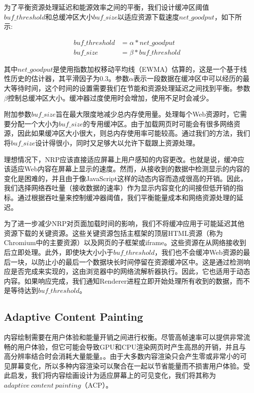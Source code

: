 \documentclass{sig-alternate-05-2015}
\begin{document}
为了平衡资源处理延迟和能源效率之间的平衡，我们设计缓冲区阈值$buf\_threshold$和总缓冲区大小$buf\_size$以适应资源下载速度$net\_goodput$，如下所示:

\begin{align*}
buf\_threshold &= \alpha * net\_goodput \\
buf\_size &= \beta * buf\_threshold
\end{align*}

其中$net\_goodput$是使用指数加权移动平均线（EWMA）估算的，这是一个基于线性历史的估计器，其平滑因子为$0.3$。\cite{9}\cite{10}参数$\alpha$表示一段数据在缓冲区中可以经历的最大等待时间，这个时间的设置需要我们在节能和资源处理延迟之间找到平衡。参数$\beta$控制总缓冲区大小。缓冲器过度使用时会增加，使用不足时会减少。

附加参数$buf\_size$旨在最大限度地减少总内存使用量。处理每个Web资源时，它需要分配一个大小为$buf\_size$的专用缓冲区。由于加载网页时可能会有很多网络资源，因此如果缓冲区大小很大，则总内存使用率可能较高。通过我们的方法，我们将$buf\_size$设计得很小，同时又足够大以允许下载跟上资源处理。

理想情况下，NRP应该直接适应屏幕上用户感知的内容更改。也就是说，缓冲应该适应Web内容在屏幕上显示的速度。然而，从接收到的数据中检测显示的内容的变化是困难的，并且由于像JavaScript这样的动态内容而造成很高的开销。因此，我们选择网络吞吐量（接收数据的速率）作为显示内容变化的间接但低开销的指标。通过根据吞吐量来控制缓冲器阈值，我们平衡能量成本和网络资源处理的延迟。

为了进一步减少NRP对页面加载时间的影响，我们不将缓冲应用于可能延迟其他资源下载的关键资源。这些关键资源包括主框架的顶层HTML资源（称为Chromium中的主要资源）以及网页的子框架或iframe。这些资源在从网络接收到后立即处理。此外，即使块大小小于$buf\_threshold$，我们也不会缓冲Web资源的最后一块，以防止小的最后一个数据块长时间停留在资源缓冲区中。这是通过检测响应是否完成来实现的，这由浏览器中的网络流解析器执行。因此，它也适用于动态内容。如果响应完成，我们通知Renderer进程立即开始处理所有收到的数据，而不是等待达到$buf\_threshold$。

\subsection{Adaptive Content Painting}

内容绘制需要在用户体验和能量开销之间进行权衡。尽管高帧速率可以提供非常流畅的用户体验，但它可能会导致GPU和CPU渲染网页时产生高昂的开销，并且与高分辨率结合时会消耗大量能量\cite{12}。。由于大多数内容渲染只会产生零或非常小的可见屏幕变化，所以多种内容渲染可以聚合在一起以节省能量而不损害用户体验。受此启发，我们将内容绘画设计为适应屏幕上的可见变化，我们将其称为$adaptive\ content\ painting$（ACP）\cite{1}。
\end{document}
